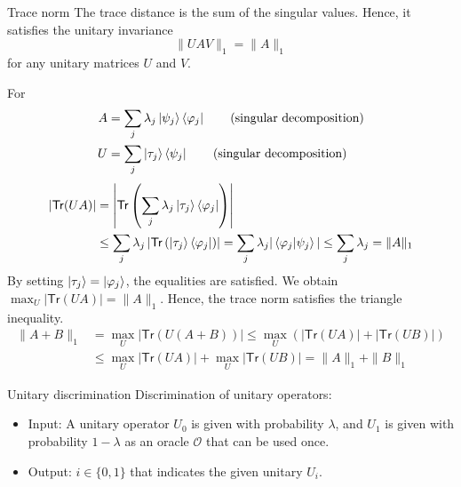 \documentclass{beamer}
\newcommand{\Tr}{\mathsf{Tr}}
\newcommand\emm[1]{\textcolor{redorange}{{#1}}}
\begin{document}
\begin{frame}{Trace norm}
\footnotesize
The trace distance is the sum of the singular values.
Hence, it satisfies the \emm{unitary invariance}
\begin{equation*}
\|UAV\|_1=\|A\|_1
\end{equation*}
for any unitary matrices $U$ and $V$.

For
\begin{align*}
A &= \sum_j \lambda_j \ket{\psi_j}\bra{\varphi_j}\qquad\text{(singular decomposition)}\\
U &= \sum_j \ket{\tau_j}\bra{\psi_j}\qquad\text{(singular decomposition)}
\end{align*}
\begin{align*}
\left|\Tr(UA)\right|
&= \left|\Tr\left(\sum_j \lambda_j \ket{\tau_j}\bra{\varphi_j}\right)\right|\\
&\le \sum_j \lambda_j \left|\Tr\left(\ket{\tau_j}\bra{\varphi_j}\right)\right|
= \sum_j \lambda_j |\braket{\varphi_j|\psi_j}|
\le \sum_j \lambda_j = \|A\|_1
\end{align*}
By setting $\ket{\tau_j}=\ket{\varphi_j}$, the equalities are satisfied. We obtain \emm{$\max_U|\Tr(UA)| = \|A\|_1$}.
Hence, the trace norm satisfies \emm{the triangle inequality}.
\begin{align*}
\|A+B\|_1 &= \max_U|\Tr(U(A+B))|
\le \max_U(|\Tr(UA)| + |\Tr(UB)|)\\
&\le \max_U|\Tr(UA)| + \max_U|\Tr(UB)|
=\|A\|_1+\|B\|_1
\end{align*}
\end{frame}

\begin{frame}{Unitary discrimination}
Discrimination of \emm{unitary operators}:

\vspace{2em}
\begin{itemize}
\setlength{\itemsep}{2em}
\item Input: A \emm{unitary operator} $U_0$ is given with probability $\lambda$, and $U_1$ is given with probability $1-\lambda$ as an oracle $\mathcal{O}$ that can be used once.
\item Output: $i\in\{0,1\}$ that indicates the given unitary $U_i$.
\end{itemize}
\end{frame}
\end{document}
